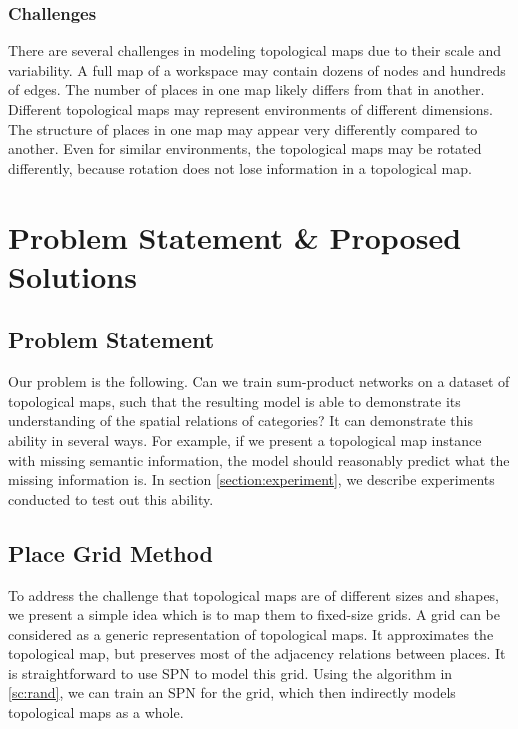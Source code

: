 \documentclass[11pt, titlepage]{article}
\theoremstyle{definition}
\begin{document}
\subsubsection{Challenges}
There are several challenges in modeling topological maps due to their scale and variability. A full map of a workspace may contain dozens of nodes and hundreds of edges. The number of places in one map likely differs from that in another. Different topological maps may represent environments of different dimensions. The structure of places in one map may appear very differently compared to another. Even for similar environments, the topological maps may be rotated differently, because rotation does not lose information in a topological map. 

\section{Problem Statement \& Proposed Solutions}\label{section:sol}
\subsection{Problem Statement}\label{section:problem}

Our problem is the following. Can we train sum-product networks on a dataset of topological maps, such that the resulting model is able to demonstrate its understanding of the spatial relations of categories? It can demonstrate this ability in several ways. For example, if we present a topological map instance with missing semantic information, the model should reasonably predict what the missing information is. In section \ref{section:experiment}, we describe experiments conducted to test out this ability.

\subsection{Place Grid Method}\label{section:grid}
To address the challenge that topological maps are of different sizes and shapes, we present a simple idea which is to map them to fixed-size grids. A grid can be considered as a generic representation of topological maps. It approximates the topological map, but preserves most of the adjacency relations between places. It is straightforward to use SPN to model this grid. Using the algorithm in \ref{sc:rand}, we can train an SPN for the grid, which then indirectly models topological maps as a whole. 
\end{document}
